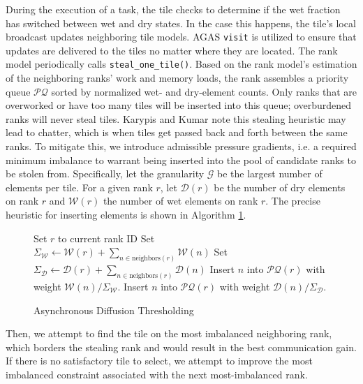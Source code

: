 During the execution of a task, the tile checks to determine if the wet fraction has switched between wet and dry states.
In the case this happens, the tile's local broadcast updates neighboring tile models.
AGAS {\tt visit} is utilized to ensure that updates are delivered to the tiles no matter where they are located.
The rank model periodically calls \texttt{steal\_one\_tile()}.
Based on the rank model's estimation of the neighboring ranks' work and memory loads, the rank assembles a priority queue $\mathcal{PQ}$ sorted by normalized wet- and dry-element counts.
Only ranks that are overworked or have too many tiles will be inserted into this queue; overburdened ranks will never steal tiles. Karypis and Kumar note this stealing heuristic may lead to chatter, which is when tiles get passed back and forth between the same ranks. To mitigate this, we introduce admissible pressure gradients, i.e. a required minimum imbalance to warrant being inserted into the pool of candidate ranks to be stolen from. Specifically, let the granularity $\mathcal{G}$ be the largest number of elements per tile. For a given rank $r$, let $\mathcal{D}(r)$ be the number of dry elements on rank $r$ and $\mathcal{W}(r)$ the number of wet elements on rank $r$. The precise heuristic for inserting elements is shown in Algorithm \ref{alg:heur}.

\begin{figure}
\begin{algorithm}[H]
\caption{Asynchronous Diffusion Thresholding}
\begin{algorithmic}
\State Set $r$ to current rank ID
\State Set $\Sigma_{\mathcal{W}} \gets \mathcal{W}(r) + \sum_{n \in \text{neighbors}(r)} \mathcal{W}(n)$
\State Set $\Sigma_{\mathcal{D}} \gets \mathcal{D}(r) + \sum_{n \in \text{neighbors}(r)} \mathcal{D}(n)$
        \State Insert $n$ into $\mathcal{PQ}(r)$ with weight $\mathcal{W}(n)/\Sigma_{\mathcal{W}}$.
    \EndIf
        \State Insert $n$ into $\mathcal{PQ}(r)$ with weight $\mathcal{D}(n)/\Sigma_{\mathcal{D}}$.
    \EndIf
\EndFor
\end{algorithmic}
\label{alg:heur}
\end{algorithm}
\end{figure}
Then, we attempt to find the tile on the most imbalanced neighboring rank, which borders the stealing rank and would result in the best communication gain. If there is no satisfactory tile to select, we attempt to improve the most imbalanced constraint associated with the next most-imbalanced rank.

